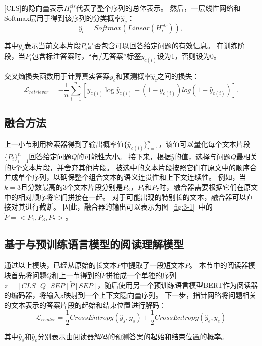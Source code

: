 [CLS]的隐向量表示$H^{cls}_i$代表了整个序列的总体表示。
然后，一层线性网络和Softmax层用于得到该序列的分类概率$\hat y_c$：
\begin{equation}
    \hat y_c=Softmax(Linear(H_i^{cls})),
\end{equation}

其中$\hat y_c$表示当前文本片段$P_i$是否包含可以回答给定问题的有效信息\cite{zhang2020retrospective}。
在训练阶段，当$P_i$包含标注答案时，“有/无答案”标签$y_{c(i)}$设为1，否则设为0。

交叉熵损失函数用于计算真实答案$y_c$和预测概率$\hat y_c$之间的损失：
\begin{equation}
    \mathcal  L_{retriever}  = -\frac{1}{n}\sum_{i=1}^{n}[y_{c(i)}\log\hat y_{c(i)}+(1-y_{c(i)})log(1-\hat y_{c(i)})].
\end{equation}

\subsection{融合方法}
上一小节利用检索器得到了输出概率值$\{\hat y_{c(i)}\}^n_{i=1}$，该值可以量化每个文本片段$\{P_i\}^n_{i=1}$回答给定问题$Q$的可能性大小。
接下来，根据$\hat y$的值，选择与问题$Q$最相关的$k$个文本片段，并舍弃其他片段。
被选中的文本片段按照它们在原文中的顺序合并成单个序列，以确保整个组合文本的语义连贯性和上下文连续性。
例如，当$k=3$且分数最高的3个文本片段分别是$P_3$，$P_1$和$P_7$时，融合器需要根据它们在原文中的相对顺序将它们拼接在一起。
对于可能出现的特别长的文本，融合器可以直接对其进行截断。
因此，融合器的输出可以表示为图~\ref{fig:3-1}~中的$\tilde P=<P_1,P_3,P_7>$。

\subsection{基于与预训练语言模型的阅读理解模型}
通过以上模块，已经从原始的长文本$P$中提取了一段短文本$\tilde P$。
本节中的阅读器模块首先将问题$Q$和上一节得到的$\tilde P$拼接成一个单独的序列$z=[CLS]Q[SEP]\tilde P[SEP]$，随后使用另一个预训练语言模型BERT\cite{devlin2018bert}作为阅读器的编码器，将输入$z$映射到一个上下文隐向量序列。
下一步，指针网略将问题相关的文本表示的答案片段的起始和结束位置进行解码：
\begin{equation}
    \mathcal L_{reader} = \frac{1}{2} CrossEntropy(\hat y_s,y_s) + \frac{1}{2} CrossEntropy(\hat y_e,y_e)
\end{equation}

其中$\hat y_s$和$\hat y_e$分别表示由阅读器解码的预测答案的起始和结束位置的概率。

